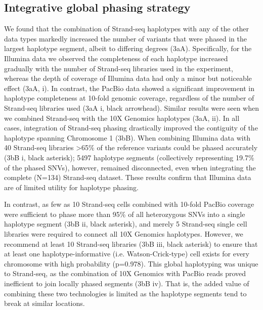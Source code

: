 \subsection{Integrative global phasing strategy}
We found that the combination of Strand-seq haplotypes with any of the other data types markedly increased the number of variants that were phased in the largest haplotype segment, albeit to differing degrees (3aA). 
Specifically, for the Illumina data we observed the completeness of each haplotype increased gradually with the number of Strand-seq libraries used in the experiment, 
whereas the depth of coverage of Illumina data had only a minor but noticeable effect (3aA, i). 
In contrast, the PacBio data showed a significant improvement in haplotype completeness at 10-fold genomic coverage, 
regardless of the number of Strand-seq libraries used (3aA i, black arrowhead). 
Similar results were seen when we combined Strand-seq with the 10X Genomics haplotypes (3aA, ii). 
In all cases, integration of Strand-seq phasing drastically improved the contiguity of the haplotype spanning Chromosome 1 (3bB). 
When combining Illumina data with 40 Strand-seq libraries >65\% of the reference variants could be phased accurately (3bB i, black asterisk); 
5497 haplotype segments (collectively representing 19.7\% of the phased SNVs), however, remained disconnected, even when integrating the complete (N=134) Strand-seq dataset. These results confirm that Illumina data are of limited utility for haplotype phasing.
    
    In contrast, as few as 10 Strand-seq cells combined with 10-fold PacBio coverage were sufficient to phase more than 95\% of all heterozygous SNVs into a single haplotype segment (3bB ii, black asterisk), 
    and merely 5 Strand-seq single cell libraries were required to connect all 10X Genomics haplotypes. 
    However, we recommend at least 10 Strand-seq libraries (3bB iii, black asterisk) to ensure that at least one haplotype-informative (i.e. Watson-Crick-type) cell exists for every chromosome with high probability (p=0.978).
    This global haplotyping was unique to Strand-seq, as the combination of 10X Genomics with PacBio reads proved inefficient to join locally phased segments (3bB iv). 
    That is, the added value of combining these two technologies is limited as the haplotype segments tend to break at similar locations.
    
